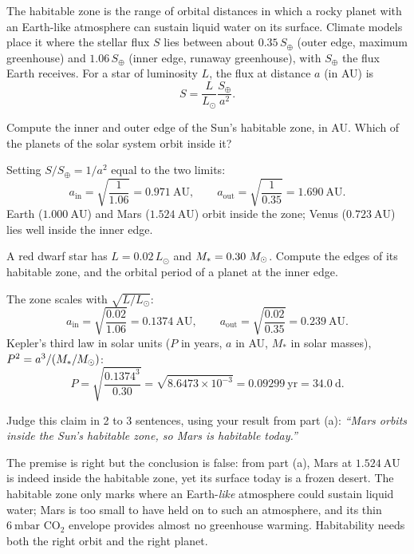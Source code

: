 The habitable zone is the range of orbital distances in which a rocky planet with an Earth-like atmosphere can sustain liquid water on its surface.
Climate models place it where the stellar flux $S$ lies between about $0.35\, S_\oplus$ (outer edge, maximum greenhouse) and $1.06\, S_\oplus$ (inner edge, runaway greenhouse), with $S_\oplus$ the flux Earth receives.
For a star of luminosity $L$, the flux at distance $a$ (in AU) is
\[
  S = \frac{L}{L_\odot} \frac{S_\oplus}{a^2}.
\]

\parti {} Compute the inner and outer edge of the Sun's habitable zone, in AU.
Which of the planets of the solar system orbit inside it?

\begin{solution}
Setting $S/S_\oplus = 1/a^2$ equal to the two limits:
\[
  a_{\mathrm{in}} = \sqrt{\frac{1}{1.06}} = 0.971\ \mathrm{AU}, \qquad
  a_{\mathrm{out}} = \sqrt{\frac{1}{0.35}} = 1.690\ \mathrm{AU}.
\]
Earth ($1.000\ \mathrm{AU}$) and Mars ($1.524\ \mathrm{AU}$) orbit inside the zone; Venus ($0.723\ \mathrm{AU}$) lies well inside the inner edge.
\end{solution}

\parti {} A red dwarf star has $L = 0.02\, L_\odot$ and $M_* = 0.30\ M_{\odot}$.
Compute the edges of its habitable zone, and the orbital period of a planet at the inner edge.

\begin{solution}
The zone scales with $\sqrt{L/L_\odot}$:
\[
  a_{\mathrm{in}} = \sqrt{\frac{0.02}{1.06}} = 0.1374\ \mathrm{AU}, \qquad
  a_{\mathrm{out}} = \sqrt{\frac{0.02}{0.35}} = 0.239\ \mathrm{AU}.
\]
Kepler's third law in solar units ($P$ in years, $a$ in AU, $M_*$ in solar masses), $P^2 = a^3 / (M_*/M_{\odot})$:
\[
  P = \sqrt{\frac{0.1374^3}{0.30}} = \sqrt{8.6473 \times 10^{-3}} = 0.09299\ \mathrm{yr} = 34.0\ \mathrm{d}.
\]
\end{solution}

\parti {} Judge this claim in 2 to 3 sentences, using your result from part (a):
\emph{``Mars orbits inside the Sun's habitable zone, so Mars is habitable today.''}

\begin{solution}
The premise is right but the conclusion is false: from part (a), Mars at $1.524\ \mathrm{AU}$ is indeed inside the habitable zone, yet its surface today is a frozen desert.
The habitable zone only marks where an Earth-\emph{like} atmosphere could sustain liquid water; Mars is too small to have held on to such an atmosphere, and its thin $6\ \mathrm{mbar}$ $\mathrm{CO_2}$ envelope provides almost no greenhouse warming.
Habitability needs both the right orbit and the right planet.
\end{solution}
